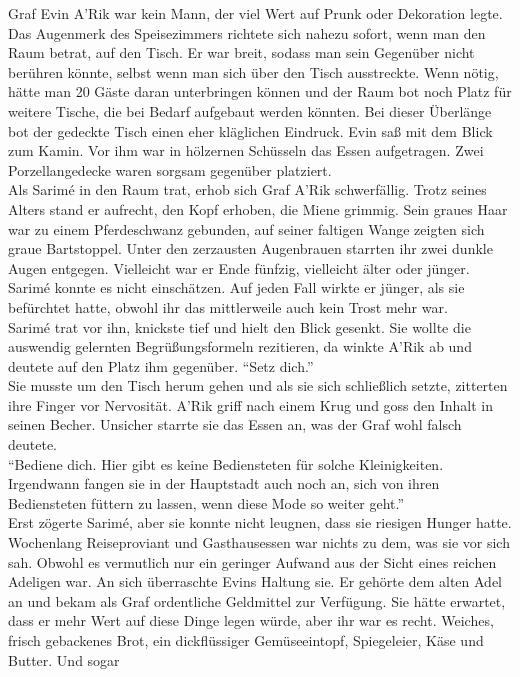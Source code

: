Graf Evin A'Rik war kein Mann, der viel Wert auf Prunk oder Dekoration legte. Das Augenmerk des 
Speisezimmers richtete sich nahezu sofort, wenn man den Raum betrat, auf den Tisch. Er war breit, 
sodass man sein Gegenüber nicht berühren könnte, selbst wenn man sich über den Tisch ausstreckte. 
Wenn nötig, hätte man 20 Gäste daran unterbringen können und der Raum bot noch Platz für weitere 
Tische, die bei Bedarf aufgebaut werden könnten. Bei dieser Überlänge bot der gedeckte Tisch einen 
eher kläglichen Eindruck. Evin saß mit dem Blick zum Kamin. Vor ihm war in hölzernen Schüsseln das 
Essen aufgetragen. Zwei Porzellangedecke waren sorgsam gegenüber platziert.\\
Als Sarimé in den Raum trat, erhob sich Graf A'Rik schwerfällig. Trotz seines Alters stand er 
aufrecht, den Kopf erhoben, die Miene grimmig. Sein graues Haar war zu einem Pferdeschwanz 
gebunden, auf seiner faltigen Wange zeigten sich graue Bartstoppel. Unter den zerzausten 
Augenbrauen starrten ihr zwei dunkle Augen entgegen. Vielleicht war er Ende fünfzig, vielleicht 
älter oder jünger. Sarimé konnte es nicht einschätzen. Auf jeden Fall wirkte er jünger, als sie 
befürchtet hatte, obwohl ihr das mittlerweile auch kein Trost mehr war.\\
Sarimé trat vor ihn, knickste tief und hielt den Blick gesenkt. Sie wollte die auswendig gelernten 
Begrüßungsformeln rezitieren, da winkte A'Rik ab und deutete auf den Platz ihm gegenüber. ``Setz 
dich.''\\
Sie musste um den Tisch herum gehen und als sie sich schließlich setzte, zitterten ihre Finger vor 
Nervosität. A'Rik griff nach einem Krug und goss den Inhalt in seinen Becher. Unsicher starrte sie 
das Essen an, was der Graf wohl falsch deutete.\\
``Bediene dich. Hier gibt es keine Bediensteten für solche Kleinigkeiten. Irgendwann fangen sie in 
der Hauptstadt auch noch an, sich von ihren Bediensteten füttern zu lassen, wenn diese Mode so 
weiter geht.''\\
Erst zögerte Sarimé, aber sie konnte nicht leugnen, dass sie riesigen Hunger hatte. Wochenlang 
Reiseproviant und Gasthausessen war nichts zu dem, was sie vor sich sah. Obwohl es vermutlich nur 
ein geringer Aufwand aus der Sicht eines reichen Adeligen war. An sich überraschte Evins Haltung 
sie. Er gehörte dem alten Adel an und bekam als Graf ordentliche Geldmittel zur Verfügung. Sie 
hätte erwartet, dass er mehr Wert auf diese Dinge legen würde, aber ihr war es recht. Weiches, 
frisch gebackenes Brot, ein dickflüssiger Gemüseeintopf, Spiegeleier, Käse und Butter. Und sogar 
